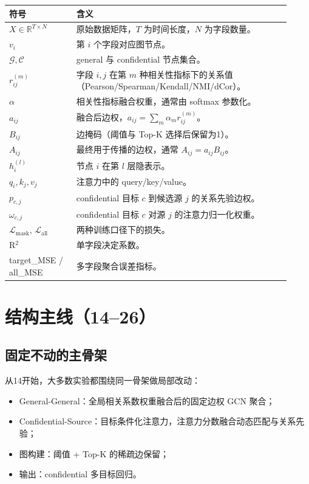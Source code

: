 \documentclass[UTF8]{ctexart}
\begin{document}
\begin{longtable}{p{0.22\linewidth}p{0.70\linewidth}}
\toprule
符号 & 含义 \\
\midrule
\endhead
\(X\in\mathbb{R}^{T\times N}\) & 原始数据矩阵，\(T\) 为时间长度，\(N\) 为字段数量。 \\
\(v_i\) & 第 \(i\) 个字段对应图节点。 \\
\(\mathcal{G},\mathcal{C}\) & general 与 confidential 节点集合。 \\
\(r_{ij}^{(m)}\) & 字段 \(i,j\) 在第 \(m\) 种相关性指标下的关系值（Pearson/Spearman/Kendall/NMI/dCor）。 \\
\(\alpha\) & 相关性指标融合权重，通常由 softmax 参数化。 \\
\(a_{ij}\) & 融合后边权，\(a_{ij}=\sum_m \alpha_m r_{ij}^{(m)}\)。 \\
\(B_{ij}\) & 边掩码（阈值与 Top-K 选择后保留为1）。 \\
\(A_{ij}\) & 最终用于传播的边权，通常 \(A_{ij}=a_{ij}B_{ij}\)。 \\
\(h_i^{(l)}\) & 节点 \(i\) 在第 \(l\) 层隐表示。 \\
\(q_i,k_j,v_j\) & 注意力中的 query/key/value。 \\
\(p_{c,j}\) & confidential 目标 \(c\) 到候选源 \(j\) 的关系先验边权。 \\
\(\omega_{c,j}\) & confidential 目标 \(c\) 对源 \(j\) 的注意力归一化权重。 \\
\(\mathcal{L}_{\text{mask}}\), \(\mathcal{L}_{\text{all}}\) & 两种训练口径下的损失。 \\
R\(^2\) & 单字段决定系数。 \\
target\_MSE / all\_MSE & 多字段聚合误差指标。 \\
\bottomrule
\end{longtable}

\section{结构主线（14--26）}

\subsection{固定不动的主骨架}

从14开始，大多数实验都围绕同一骨架做局部改动：
\begin{itemize}
    \item General-General：全局相关系数权重融合后的固定边权 GCN 聚合；
    \item Confidential-Source：目标条件化注意力，注意力分数融合动态匹配与关系先验；
    \item 图构建：阈值 + Top-K 的稀疏边保留；
    \item 输出：confidential 多目标回归。
\end{itemize}
\end{document}
